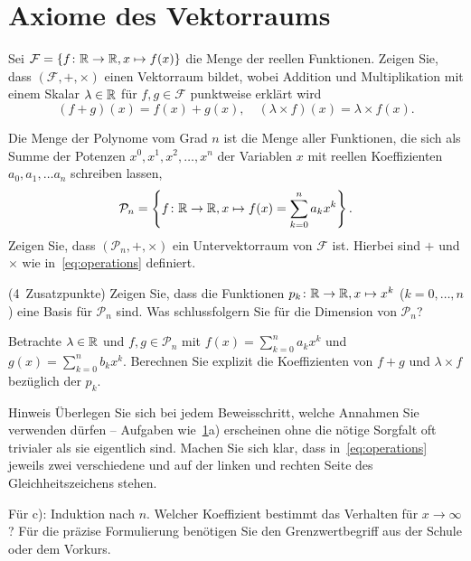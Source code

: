 \documentclass{scrartcl}
\newcommand{\FF}{\mathcal{F}}
\newcommand{\PP}{\mathcal{P}}
\begin{document}
\maketitle

\section{Axiome des Vektorraums }
\label{ex:functionspace}
\begin{subex}
  \item{} Sei $\FF = \{ f\colon \RR\to\RR, x \mapsto f(x) \}$ die Menge der reellen Funktionen.
  Zeigen Sie, dass $(\FF,+,\times)$ einen Vektorraum bildet, wobei Addition und Multiplikation mit einem Skalar $\lambda \in \mathbb{R}$ für $f, g \in \FF$ punktweise erklärt wird
  \[
    \label{eq:operations}\tag{*}
    (f + g)(x) = f(x) + g(x), \quad (\lambda \times f)(x) = \lambda \times f(x).
  \]

  \item{} Die Menge der Polynome vom Grad $n$ ist die Menge aller Funktionen, die sich als Summe der Potenzen $x^0,x^1,x^2,\dots, x^n$ der Variablen $x$ mit reellen Koeffizienten $a_0, a_1, \dots a_n$ schreiben lassen,
  \[
    \PP_n  = \left\{ f\colon \RR \to \RR, x \mapsto f(x) = \sum_{k=0}^n a_k x^k \right\}.
  \]
  Zeigen Sie, dass $(\PP_n,+,\times)$ ein Untervektorraum von $\FF$ ist.
  Hierbei sind $+$ und $\times$ wie in~\eqref{eq:operations} definiert.

  \item(4\ Zusatzpunkte) Zeigen Sie, dass die Funktionen $p_k\colon \mathbb{R} \to \mathbb{R}, x \mapsto x^k$ ($k=0,\ldots,n$) eine Basis für $\PP_n$ sind.
  Was schlussfolgern Sie für die Dimension von $\PP_n$?

  \item{} Betrachte $\lambda \in \mathbb{R}$ und $f,g \in \PP_n$ mit $f(x) = \sum_{k=0}^n a_k x^k$ und $g(x) = \sum_{k=0}^n b_k x^k$.
  Berechnen Sie explizit die Koeffizienten von $f + g$ und $\lambda \times f$ bezüglich der $p_k$.
\end{subex}

\begin{remark}{Hinweis}
  Überlegen Sie sich bei jedem Beweisschritt, welche Annahmen Sie verwenden dürfen -- Aufgaben wie~\ref{ex:functionspace}a) erscheinen ohne die nötige Sorgfalt oft trivialer als sie eigentlich sind.
  Machen Sie sich klar, dass in~\eqref{eq:operations} jeweils zwei verschiedene \quotes{$+$} und \quotes{$\times$} auf der linken und rechten Seite des Gleichheitszeichens stehen.

  Für c): Induktion nach $n$.
  Welcher Koeffizient bestimmt das Verhalten für $x \to \infty$?
  Für die präzise Formulierung benötigen Sie den Grenzwertbegriff aus der Schule oder dem Vorkurs.
\end{remark}
\end{document}

